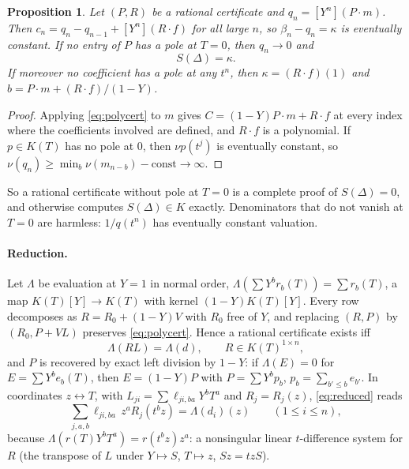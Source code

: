\documentclass[11pt,a4paper]{article}
\newcommand{\val}{\nu}
\theoremstyle{plain}
\newtheorem{proposition}[theorem]{Proposition}
\theoremstyle{definition}
\theoremstyle{remark}
\begin{document}
\begin{proposition}\label{prop:polycert}
Let $(P,R)$ be a rational certificate and $q_n=[Y^n](P\cdot m)$. Then
$c_n=q_n-q_{n-1}+[Y^n](R\cdot f)$ for all large $n$, so $\beta_n-q_n=\kappa$ is
eventually constant. If no entry of $P$ has a pole at $T=0$, then $q_n\to0$ and
\[
  S(\Delta)=\kappa .
\]
If moreover no coefficient has a pole at any $t^n$, then $\kappa=(R\cdot f)(1)$
and $b=P\cdot m+(R\cdot f)/(1-Y)$.
\end{proposition}
\begin{proof}
Applying \eqref{eq:polycert} to $m$ gives $C=(1-Y)P\cdot m+R\cdot f$ at every
index where the coefficients involved are defined, and $R\cdot f$ is a polynomial.
If $p\in K(T)$ has no pole at $0$, then $\val p(t^j)$ is eventually constant, so
$\val(q_n)\ge\min_b\val(m_{n-b})-\mathrm{const}\to\infty$.
\end{proof}

So a rational certificate without pole at $T=0$ is a complete proof of
$S(\Delta)=0$, and otherwise computes $S(\Delta)\in K$ exactly. Denominators
that do not vanish at $T=0$ are harmless: $1/q(t^n)$ has eventually constant
valuation.

\paragraph{Reduction.} Let $\Lambda$ be evaluation at $Y=1$ in normal order,
$\Lambda(\sum Y^br_b(T))=\sum r_b(T)$, a map $K(T)[Y]\to K(T)$ with kernel
$(1-Y)K(T)[Y]$. Every row decomposes as $R=R_0+(1-Y)V$ with $R_0$ free of $Y$,
and replacing $(R,P)$ by $(R_0,P+VL)$ preserves \eqref{eq:polycert}. Hence a
rational certificate exists iff
\begin{equation}\label{eq:reduced}
  \Lambda(RL)=\Lambda(d),\qquad R\in K(T)^{1\times n},
\end{equation}
and $P$ is recovered by exact left division by $1-Y$: if $\Lambda(E)=0$ for
$E=\sum Y^be_b(T)$, then $E=(1-Y)P$ with $P=\sum Y^bp_b$,
$p_b=\sum_{b'\le b}e_{b'}$. In coordinates $z\leftrightarrow T$, with
$L_{ji}=\sum\ell_{ji,ba}Y^bT^a$ and $R_j=R_j(z)$, \eqref{eq:reduced} reads
\begin{equation}\label{eq:dual}
  \sum_{j,a,b}\ell_{ji,ba}\,z^aR_j(t^bz)=\Lambda(d_i)(z)\qquad(1\le i\le n),
\end{equation}
because $\Lambda(r(T)Y^bT^a)=r(t^bz)z^a$: a nonsingular linear $t$-difference
system for $R$ (the transpose of $L$ under $Y\mapsto S$, $T\mapsto z$, $Sz=tzS$).
\end{document}
